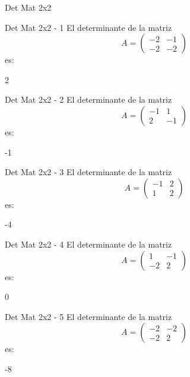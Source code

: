\documentclass[a4,11pt]{aleph-notas}
\begin{document}
\begin{quiz}{Det Mat 2x2}

\begin{numerical}[tolerance=0]%
    {Det Mat 2x2 - 1}
    El determinante de la matriz
    \[
        A = \begin{pmatrix} -2 & -1 \\ -2 & -2 \end{pmatrix}
    \]
    es:
    \item[] 2
\end{numerical}

\begin{numerical}[tolerance=0]%
    {Det Mat 2x2 - 2}
    El determinante de la matriz
    \[
        A = \begin{pmatrix} -1 & 1 \\ 2 & -1 \end{pmatrix}
    \]
    es:
    \item[] -1
\end{numerical}

\begin{numerical}[tolerance=0]%
    {Det Mat 2x2 - 3}
    El determinante de la matriz
    \[
        A = \begin{pmatrix} -1 & 2 \\ 1 & 2 \end{pmatrix}
    \]
    es:
    \item[] -4
\end{numerical}

\begin{numerical}[tolerance=0]%
    {Det Mat 2x2 - 4}
    El determinante de la matriz
    \[
        A = \begin{pmatrix} 1 & -1 \\ -2 & 2 \end{pmatrix}
    \]
    es:
    \item[] 0
\end{numerical}

\begin{numerical}[tolerance=0]%
    {Det Mat 2x2 - 5}
    El determinante de la matriz
    \[
        A = \begin{pmatrix} -2 & -2 \\ -2 & 2 \end{pmatrix}
    \]
    es:
    \item[] -8
\end{numerical}


\end{quiz}
\end{document}
